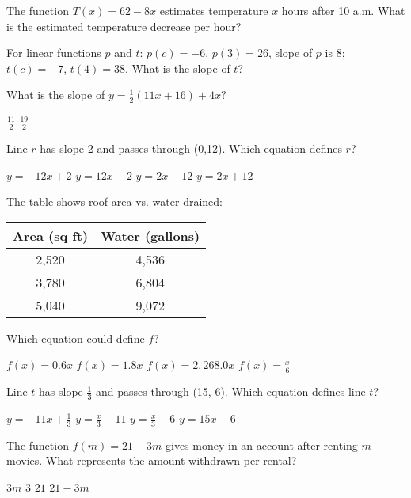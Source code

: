 \documentclass[12pt]{exam}
\begin{document}
\begin{questions}
\question The function $T(x) = 62 - 8x$ estimates temperature $x$ hours after 10 a.m. What is the estimated temperature decrease per hour?
\begin{choices}
\end{choices}

\question For linear functions $p$ and $t$: $p(c) = -6$, $p(3) = 26$, slope of $p$ is 8; $t(c) = -7$, $t(4) = 38$. What is the slope of $t$?
\begin{choices}
\end{choices}

\question What is the slope of $y = \frac{1}{2}(11x + 16) + 4x$?
\begin{choices}
\choice $\frac{11}{2}$
\choice $\frac{19}{2}$
\end{choices}

\question Line $r$ has slope 2 and passes through (0,12). Which equation defines $r$?
\begin{choices}
\choice $y = -12x + 2$
\choice $y = 12x + 2$
\choice $y = 2x - 12$
\choice $y = 2x + 12$
\end{choices}

\question The table shows roof area vs. water drained:
\begin{center}
\begin{tabular}{|c|c|}
\hline
Area (sq ft) & Water (gallons) \\
\hline
2,520 & 4,536 \\
3,780 & 6,804 \\
5,040 & 9,072 \\
\hline
\end{tabular}
\end{center}
Which equation could define $f$?
\begin{choices}
\choice $f(x) = 0.6x$
\choice $f(x) = 1.8x$
\choice $f(x) = 2,268.0x$
\choice $f(x) = \frac{x}{6}$
\end{choices}

\question Line $t$ has slope $\frac{1}{3}$ and passes through (15,-6). Which equation defines line $t$?
\begin{choices}
\choice $y = -11x + \frac{1}{3}$
\choice $y = \frac{x}{3} - 11$
\choice $y = \frac{x}{3} - 6$
\choice $y = 15x - 6$
\end{choices}

\question The function $f(m) = 21 - 3m$ gives money in an account after renting $m$ movies. What represents the amount withdrawn per rental?
\begin{choices}
\choice $3m$
\choice $3$
\choice $21$
\choice $21 - 3m$
\end{choices}


\end{questions}
\end{document}
